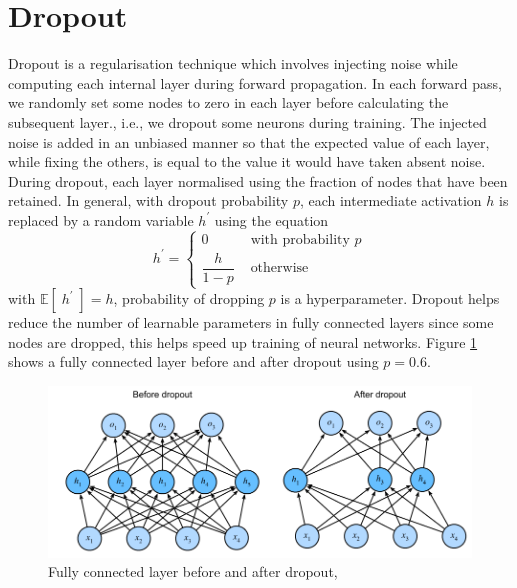 \documentclass[12pt]{report}
\numberwithin{equation}{section}
\begin{document}
\section{Dropout}
Dropout \textbf{\cite{vsrivastava14a}} is a regularisation technique which involves injecting noise while computing each internal layer during forward propagation. In each forward pass, we randomly set some nodes to zero in each layer before calculating the subsequent layer., i.e., we dropout some neurons during training. The injected noise is added in an unbiased manner so that the expected value of each layer, while fixing the others, is equal to the value it would have taken absent noise. During dropout, each layer  normalised using the fraction of nodes that have been retained. In general, with dropout probability $p$, each intermediate activation $h$ is replaced by a random variable $h^{\prime}$ using the equation
\begin{equation}\label{eqn:dropout}
h^{\prime}=\left\{\begin{array}{ll}
0 & \text { with probability } p \\
\dfrac{h}{1-p} & \text { otherwise }
\end{array}\right.
\end{equation} \noindent 
with $\mathbb{E}[\;h^{\prime}\;] = h$, probability of dropping $p$ is a hyperparameter. Dropout helps reduce the number of learnable parameters in fully connected layers since some nodes are dropped, this helps speed up training of neural networks. Figure \ref{fig:dropout} shows a fully connected layer before and after dropout using $p=0.6$.
\begin{figure}[H]
\centering
\includegraphics[scale=0.9]{png/dropout.png}
\caption[Fully connected layer before and after dropout]{Fully connected layer before and after dropout, \textbf{\cite{zhang2020dive}}}
\label{fig:dropout}
\end{figure}
\end{document}
